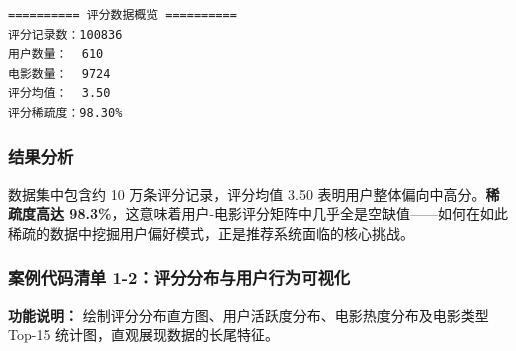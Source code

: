\documentclass[12pt,a4paper]{ctexart}
\begin{document}
{\footnotesize
\begin{verbatim}
========== 评分数据概览 ==========
评分记录数：100836
用户数量：  610
电影数量：  9724
评分均值：  3.50
评分稀疏度：98.30%
\end{verbatim}
}

\subsubsection{结果分析}

数据集中包含约 10 万条评分记录，评分均值 3.50 表明用户整体偏向中高分。\textbf{稀疏度高达 98.3\%}，这意味着用户-电影评分矩阵中几乎全是空缺值——如何在如此稀疏的数据中挖掘用户偏好模式，正是推荐系统面临的核心挑战。

\subsubsection{案例代码清单 1-2：评分分布与用户行为可视化}

\textbf{功能说明：} 绘制评分分布直方图、用户活跃度分布、电影热度分布及电影类型 Top-15 统计图，直观展现数据的长尾特征。
\end{document}
